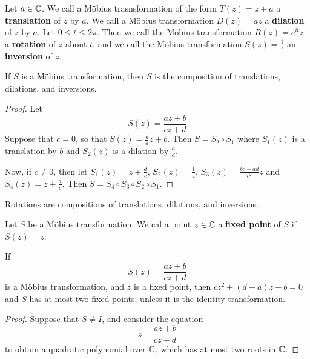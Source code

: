 \begin{definition}
    Let $a \in \mathbb{C}$. We call a M\"obius trasnsformation of the form $T(z)=z+a$ a
    \textbf{translation} of $z$ by  $a$. We call a M\"obius transformation
    $D(z)=az$ a \textbf{dilation} of $z$ by  $a$.  Let $0 \leq t \leq 2\pi$.
    Then we call the M\"obius transformation  $R(z)=e^{it}z$ a \textbf{rotation}
    of $z$ about  $t$, and we call the M\"obius transformation
    $S(z)=\frac{1}{z}$ an \textbf{inversion} of $z$.
\end{definition}

\begin{lemma}\label{3.3.2}
    If $S$ is a M\"obius transformation, then  $S$ is the composition of
    translations, dilations, and inversions.
\end{lemma}
\begin{proof}
    Let
    \begin{equation*}
        S(z)=\frac{az+b}{cz+d}
    \end{equation*}
    Suppose that $c=0$, so that  $S(z)=\frac{a}{d}z+b$. Then $S=S_2 \circ S_1$
    where $S_1(z)$ is a translation by $b$ and $S_2(z)$ is a dilation by
    $\frac{a}{d}$.

    Now, if $c \neq 0$, then let  $S_1(z)=z+\frac{d}{c}$,
    $S_2(z)=\frac{1}{z}$, $S_3(z)=\frac{bc-ad}{c^2}z$ and
    $S_4(z)=z+\frac{a}{c}$. Then $S=S_4 \circ S_3 \circ S_2 \circ S_1$.
\end{proof}
\begin{corollary}
    Rotations are compositions of translations, dilations, and inversions.
\end{corollary}

\begin{definition}
    Let $S$ be a M\"obius transformation. We cal a point $z \in \mathbb{C}$ a
    \textbf{fixed point} of $S$ if  $S(z)=z$.
\end{definition}

\begin{lemma}\label{3.3.3}
    If
    \begin{equation*}
        S(z)=\frac{az+b}{cz+d}
    \end{equation*}
    is a M\"obius transformation, and $z$ is a fixed point, then
    $cz^2+(d-a)z-b=0$ and $S$ has at most two fixed points; unless it is the
    identity transformation.
\end{lemma}
\begin{proof}
    Suppose that $S \neq I$, and consider the equation
    \begin{equation*}
        z=\frac{az+b}{cz+d}
    \end{equation*}
    to obtain a quadratic polynomial over $\mathbb{C}$, which has at most two roots in
    $\mathbb{C}$.
\end{proof}

